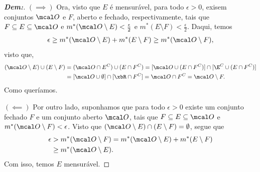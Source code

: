 \bigline
\begin{proof}[\textbf{Dem:}]
  \hfill 
  
  \noindent 
  $(\implies)$ Ora, visto que $E$ é mensurável, para todo $\epsilon > 0$, exisem conjuntos 
  $\mcal O$ e $F$, aberto e fechado, respectivamente, tais que 
  $F\subseteq E \subseteq \mcal O$ e $m^*(\mcal O\setminus E) < \frac{\epsilon}{2}$
  e $m^*(E\setminus F) < \frac{\epsilon}{2}$. Daqui, temos
  \begin{align*}
    \epsilon \ge m^*(\mcal O\setminus E) + m^*(E\setminus F) \ge m^*(\mcal O \setminus F), 
  \end{align*}
  visto que, 
  \begin{align*}
    (\mcal O \setminus E) \cup (E \setminus F) &= 
    (\mcal O \cap E^C) \cup (E \cap F^C) = [\mcal O \cup (E \cap F^C)] \cap [\E^C \cup 
    (E \cap F^C)]\\ 
    &= [\mcal O\cup \emptyset] \cap [\xbR \cap F^C]
    = \mcal O \cap F^C = \mcal O \setminus F.
  \end{align*}
  Como queríamos.

  \noindent 
  $(\impliedby)$ Por outro lado, suponhamos que para todo $\epsilon>0$ existe 
  um conjunto fechado $F$ e um conjunto aberto $\mcal O$, tais que 
  $F \subseteq E \subseteq \mcal O$ e $m^*(\mcal O\setminus F) < \epsilon$.
  Visto que $(\mcal O\setminus E) \cap (E\setminus F) = \emptyset$, segue que 
  \begin{align*}
    \epsilon &> m^*(\mcal O\setminus F) = m^*(\mcal O \setminus E) + m^*(E \setminus F)\\
    &\ge m^*(\mcal O\setminus E).
  \end{align*}
  Com isso, temos $E$ mensurável.
\end{proof}
\biglinend
\newpage
{}
\bigline 
